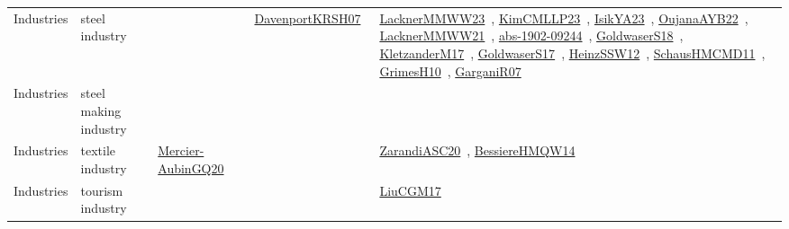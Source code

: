 {\begin{longtable}{lp{3cm}>{\raggedright\arraybackslash}p{6cm}>{\raggedright\arraybackslash}p{6cm}>{\raggedright\arraybackslash}p{8cm}}
Industries & steel industry &  & \href{works/DavenportKRSH07.pdf}{DavenportKRSH07}~\cite{DavenportKRSH07} & \href{works/LacknerMMWW23.pdf}{LacknerMMWW23}~\cite{LacknerMMWW23}, \href{works/KimCMLLP23.pdf}{KimCMLLP23}~\cite{KimCMLLP23}, \href{works/IsikYA23.pdf}{IsikYA23}~\cite{IsikYA23}, \href{works/OujanaAYB22.pdf}{OujanaAYB22}~\cite{OujanaAYB22}, \href{works/LacknerMMWW21.pdf}{LacknerMMWW21}~\cite{LacknerMMWW21}, \href{works/abs-1902-09244.pdf}{abs-1902-09244}~\cite{abs-1902-09244}, \href{works/GoldwaserS18.pdf}{GoldwaserS18}~\cite{GoldwaserS18}, \href{works/KletzanderM17.pdf}{KletzanderM17}~\cite{KletzanderM17}, \href{works/GoldwaserS17.pdf}{GoldwaserS17}~\cite{GoldwaserS17}, \href{works/HeinzSSW12.pdf}{HeinzSSW12}~\cite{HeinzSSW12}, \href{works/SchausHMCMD11.pdf}{SchausHMCMD11}~\cite{SchausHMCMD11}, \href{works/GrimesH10.pdf}{GrimesH10}~\cite{GrimesH10}, \href{works/GarganiR07.pdf}{GarganiR07}~\cite{GarganiR07}\\
Industries & steel making industry &  &  & \\
Industries & textile industry & \href{works/Mercier-AubinGQ20.pdf}{Mercier-AubinGQ20}~\cite{Mercier-AubinGQ20} &  & \href{works/ZarandiASC20.pdf}{ZarandiASC20}~\cite{ZarandiASC20}, \href{works/BessiereHMQW14.pdf}{BessiereHMQW14}~\cite{BessiereHMQW14}\\
Industries & tourism industry &  &  & \href{works/LiuCGM17.pdf}{LiuCGM17}~\cite{LiuCGM17}\\
\end{longtable}
}

